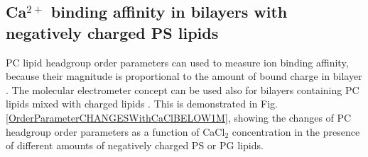 \documentclass[aps,prl,superscriptaddress,twocolumn]{revtex4}
\begin{document}
\subsection{Ca$^{2+}$ binding affinity in bilayers with negatively charged PS lipids}

PC lipid headgroup order parameters can used to measure ion binding
affinity, because their magnitude is proportional
to the amount of bound charge in bilayer \cite{seelig87,catte16}.
The molecular electrometer concept can be used also
for bilayers containing PC lipids mixed with charged lipids \cite{borle85,macdonald87,roux90}.
This is demonstrated in Fig. %
\ref{OrderParameterCHANGESWithCaClBELOW1M},
showing the changes of PC headgroup order parameters %
as a function of CaCl$_2$ concentration in the presence of different amounts of
negatively charged PS or PG lipids.
\end{document}
